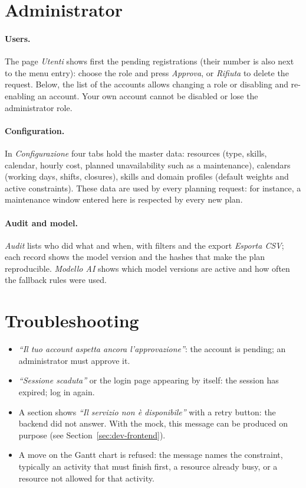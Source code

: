 \section{Administrator}
\label{sec:ug-admin}

\paragraph{Users.} The page \emph{Utenti} shows first the pending registrations (their number is
also next to the menu entry): choose the role and press \emph{Approva}, or \emph{Rifiuta} to
delete the request. Below, the list of the accounts allows changing a role or disabling and
re-enabling an account. Your own account cannot be disabled or lose the administrator role.

\paragraph{Configuration.} In \emph{Configurazione} four tabs hold the master data: resources
(type, skills, calendar, hourly cost, planned unavailability such as a maintenance), calendars
(working days, shifts, closures), skills and domain profiles (default weights and active
constraints). These data are used by every planning request: for instance, a maintenance window
entered here is respected by every new plan.

\paragraph{Audit and model.} \emph{Audit} lists who did what and when, with filters and the
export \emph{Esporta CSV}; each record shows the model version and the hashes that make the plan
reproducible. \emph{Modello AI} shows which model versions are active and how often the fallback
rules were used.

\section{Troubleshooting}
\label{sec:ug-troubleshooting}

\begin{itemize}
  \item \emph{``Il tuo account aspetta ancora l'approvazione''}: the account is pending; an
        administrator must approve it.
  \item \emph{``Sessione scaduta''} or the login page appearing by itself: the session has
        expired; log in again.
  \item A section shows \emph{``Il servizio non è disponibile''} with a retry button: the backend
        did not answer. With the mock, this message can be produced on purpose (see
        Section~\ref{sec:dev-frontend}).
  \item A move on the Gantt chart is refused: the message names the constraint, typically an
        activity that must finish first, a resource already busy, or a resource not allowed for
        that activity.
\end{itemize}
